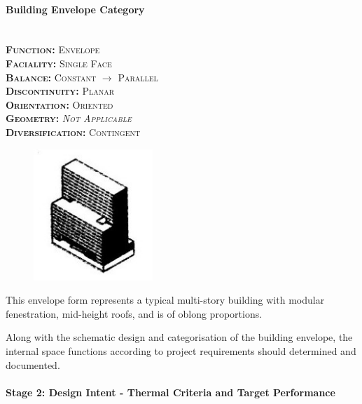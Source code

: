 \setlength{\columnseprule}{0pt}
\begin{multicols}{2}
	\paragraph{Building Envelope Category}\mbox{}\\
	\vspace {0.5cm}	
	\small \textsc{\textbf{Function:} Envelope\\
	\vspace {0.3cm}
	\textbf{Faciality:} Single Face\\
	\vspace {0.3cm}
	\textbf{Balance:} Constant $\rightarrow$ Parallel\\
	\vspace {0.3cm}
	\textbf{Discontinuity:} Planar\\
	\vspace {0.3cm}
	\textbf{Orientation:} Oriented\\
	\vspace {0.3cm}
	\textbf{Geometry:} \emph{Not Applicable}\\
	\vspace {0.3cm}
	\textbf{Diversification:} Contingent\\}
	\normalsize
	\columnbreak
	\vspace{3.5cm}
	\begin{figure}[H]
		\centering
		\includegraphics[width=0.4\textwidth]{./Images/11-Envelope2}
	\end{figure}
\end{multicols}
\vspace{-5mm}

This envelope form represents a typical multi-story building with modular fenestration, mid-height roofs, and is of oblong proportions.

Along with the schematic design and categorisation of the building envelope, the internal space functions according to project requirements should determined and documented.

\paragraph{Stage 2: Design Intent - Thermal Criteria and Target Performance}\mbox{}\\

